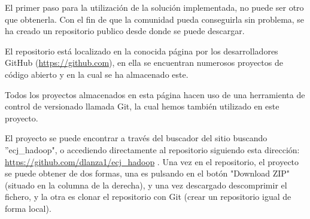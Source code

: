El primer paso para la utilización de la solución implementada, no puede ser otro que obtenerla. Con el fin de que la comunidad pueda conseguirla sin problema, se ha creado un repositorio publico desde donde se puede descargar.

El repositorio est\'a localizado en la conocida p\'agina por los desarrolladores GitHub (\url{https://github.com}), en ella se encuentran numerosos proyectos de código abierto y en la cual se ha almacenado este.

Todos los proyectos almacenados en esta p\'agina hacen uso de una herramienta de control de versionado llamada Git, la cual hemos también utilizado en este proyecto.


El proyecto se puede encontrar a través del buscador del sitio buscando ''ecj\_hadoop", o accediendo directamente al repositorio siguiendo esta dirección: \url{https://github.com/dlanza1/ecj_hadoop} . Una vez en el repositorio, el proyecto se puede obtener de dos formas, una es pulsando en el botón "Download ZIP" (situado en la columna de la derecha), y una vez descargado descomprimir el fichero, y la otra es clonar el repositorio con Git (crear un repositorio igual de forma local).

